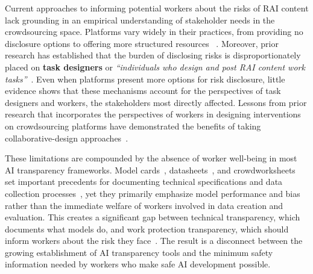 Current approaches to informing potential workers about the risks of RAI content lack grounding in an empirical understanding of stakeholder needs in the crowdsourcing space. Platforms vary widely in their practices, from providing no disclosure options to offering more structured resources ~\cite{prolific2025participant, prolific2025sensitive, ProlificAPIContentWarning2025}. Moreover, prior research has established that the burden of disclosing risks is disproportionately placed on \textbf{task designers} or \textit{``individuals who design and post RAI content work tasks''}~\cite{qian2025locating}. Even when platforms present more options for risk disclosure, little evidence shows that these mechanisms account for the perspectives of task designers and workers, the stakeholders most directly affected. Lessons from prior research that incorporates the perspectives of workers in designing interventions on crowdsourcing platforms have demonstrated the benefits of taking collaborative-design approaches~\cite{irani2016stories, mturk2018aup, silberman2018responsible}.

These limitations are compounded by the absence of worker well-being in most AI transparency frameworks. Model cards~\cite{mitchell2019model}, datasheets~\cite{gebru2021datasheets}, and crowdworksheets~\cite{diaz2022crowdworksheets} set important precedents for documenting technical specifications and data collection processes~\cite{gebru2021datasheets, diaz2022crowdworksheets, mitchell2019model}, yet they primarily emphasize model performance and bias rather than the immediate welfare of workers involved in data creation and evaluation. This creates a significant gap between technical transparency, which documents what models do, and work protection transparency, which should inform workers about the risk they face~\cite{bharucha2023content}. The result is a disconnect between the growing establishment of AI transparency tools and the minimum safety information needed by workers who make safe AI development possible. 

